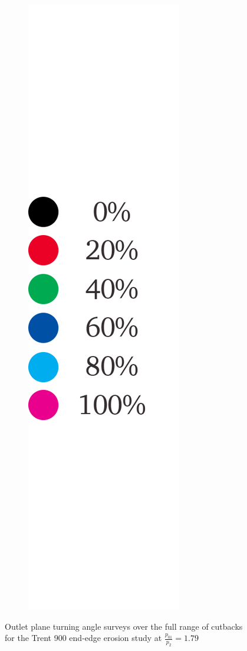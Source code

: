 \documentclass[a4paper, 11pt, oneside]{report}
\begin{document}
\begin{figure}[H]
\begin{subfigure}{.1125\textwidth}
		\includegraphics[width=\linewidth]{figs/ss_cutbacks_vs_capacities_trends_legend_ver02.png}
	\end{subfigure}
	\caption{Outlet plane turning angle surveys over the full range of cutbacks for the Trent 900 end-edge erosion study at $\frac{p_{01}}{p_2}=1.79$}
      \label{fig:ss_cutbacks_turning_angle_surveys}
\end{figure}
\end{document}
